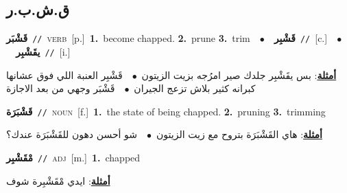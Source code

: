\documentclass[10pt,a4paper,twoside]{article} %
\begin{document}
\begin{multicols}{2}
\vspace{-3mm}
\subsection*{\color{blue}\foreignlanguage{arabic}{ق.ش.ب.ر}\color{blue}{}} 

{\setlength\topsep{0pt}\textbf{\foreignlanguage{arabic}{قَشْبَر}}\ {\color{gray}\texttt{//}\color{black}}\ \textsc{verb}\ [p.]\ \textbf{1.}~become chapped.  \textbf{2.}~prune  \textbf{3.}~trim\ \ $\bullet$\ \ \setlength\topsep{0pt}\textbf{\foreignlanguage{arabic}{قَشْبِر}}\ {\color{gray}\texttt{//}\color{black}}\ [c.]\ \ $\bullet$\ \ \setlength\topsep{0pt}\textbf{\foreignlanguage{arabic}{يقَشْبِر}}\ {\color{gray}\texttt{//}\color{black}}\ [i.]\  \begin{flushright}\color{gray}\foreignlanguage{arabic}{\textbf{\underline{\foreignlanguage{arabic}{أمثلة}}}: بس يقَشْبِر جلدك صير امرُجه بزيت الزيتون\ $\bullet$\ \  قَشْبِر العنبة اللي فوق عشانها كبرانه كثير بلاش تزعج الجيران\ $\bullet$\ \  قَشْبَر وجهي من بعد الاجازة}\end{flushright}\color{black}} \vspace{2mm}

{\setlength\topsep{0pt}\textbf{\foreignlanguage{arabic}{قَشْبَرَة}}\ {\color{gray}\texttt{//}\color{black}}\ \textsc{noun}\ [f.]\ \textbf{1.}~the state of being chapped.  \textbf{2.}~pruning  \textbf{3.}~trimming\  \begin{flushright}\color{gray}\foreignlanguage{arabic}{\textbf{\underline{\foreignlanguage{arabic}{أمثلة}}}: هاي القَشْبَرَة بتروح مع زيت الزيتون\ $\bullet$\ \  شو أحسن دهون للقَشْبَرَة عندك؟}\end{flushright}\color{black}} \vspace{2mm}

{\setlength\topsep{0pt}\textbf{\foreignlanguage{arabic}{مْقَشْبِر}}\ {\color{gray}\texttt{//}\color{black}}\ \textsc{adj}\ [m.]\ \textbf{1.}~chapped\  \begin{flushright}\color{gray}\foreignlanguage{arabic}{\textbf{\underline{\foreignlanguage{arabic}{أمثلة}}}: ايدي مْقَشْبِرة شوف}\end{flushright}\color{black}} \vspace{2mm}


\end{multicols}
\end{document}
